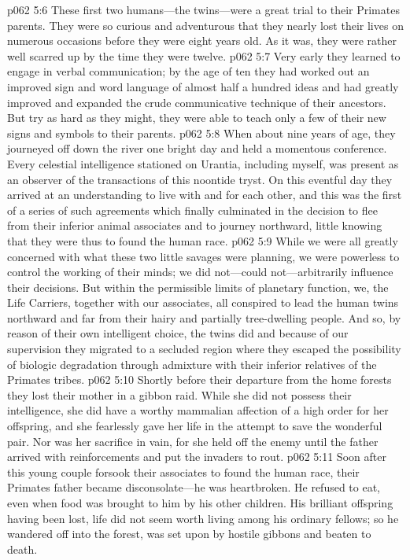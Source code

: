 \vs p062 5:6 These first two humans---the twins---were a great trial to their Primates parents. They were so curious and adventurous that they nearly lost their lives on numerous occasions before they were eight years old. As it was, they were rather well scarred up by the time they were twelve.
\vs p062 5:7 Very early they learned to engage in verbal communication; by the age of ten they had worked out an improved sign and word language of almost half a hundred ideas and had greatly improved and expanded the crude communicative technique of their ancestors. But try as hard as they might, they were able to teach only a few of their new signs and symbols to their parents.
\vs p062 5:8 When about nine years of age, they journeyed off down the river one bright day and held a momentous conference. Every celestial intelligence stationed on Urantia, including myself, was present as an observer of the transactions of this noontide tryst. On this eventful day they arrived at an understanding to live with and for each other, and this was the first of a series of such agreements which finally culminated in the decision to flee from their inferior animal associates and to journey northward, little knowing that they were thus to found the human race.\plusone
\vs p062 5:9 While we were all greatly concerned with what these two little savages were planning, we were powerless to control the working of their minds; we did not---could not---arbitrarily influence their decisions. But within the permissible limits of planetary function, we, the Life Carriers, together with our associates, all conspired to lead the human twins northward and far from their hairy and partially tree\hyp{}dwelling people. And so, by reason of their own intelligent choice, the twins did  and because of our supervision they migrated  to a secluded region where they escaped the possibility of biologic degradation through admixture with their inferior relatives of the Primates tribes.
\vs p062 5:10 Shortly before their departure from the home forests they lost their mother in a gibbon raid. While she did not possess their intelligence, she did have a worthy mammalian affection of a high order for her offspring, and she fearlessly gave her life in the attempt to save the wonderful pair. Nor was her sacrifice in vain, for she held off the enemy until the father arrived with reinforcements and put the invaders to rout.
\vs p062 5:11 Soon after this young couple forsook their associates to found the human race, their Primates father became disconsolate---he was heartbroken. He refused to eat, even when food was brought to him by his other children. His brilliant offspring having been lost, life did not seem worth living among his ordinary fellows; so he wandered off into the forest, was set upon by hostile gibbons and beaten to death.
